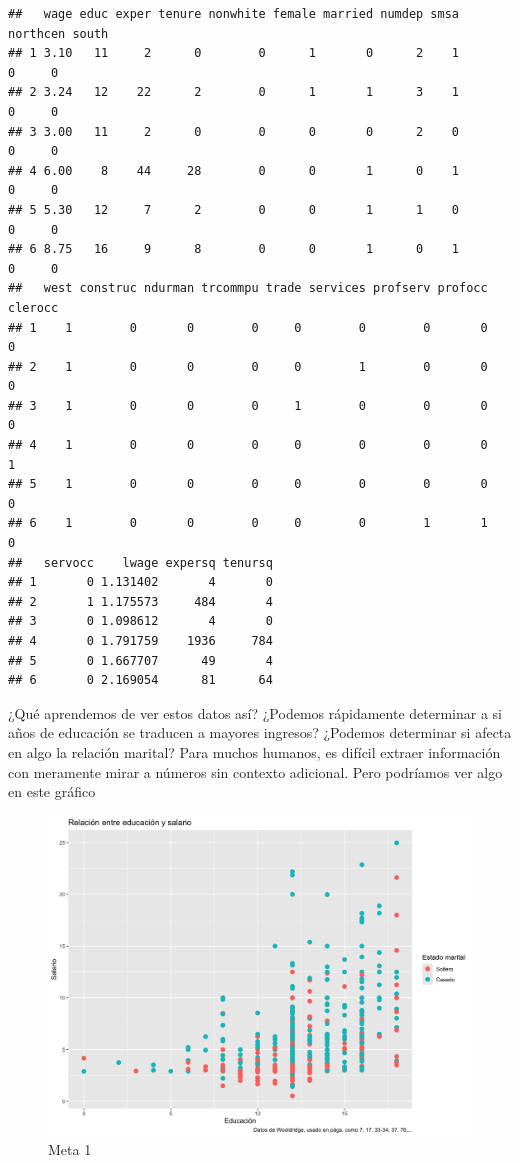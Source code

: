 \documentclass[
]{article}
\begin{document}
\begin{verbatim}
##   wage educ exper tenure nonwhite female married numdep smsa northcen south
## 1 3.10   11     2      0        0      1       0      2    1        0     0
## 2 3.24   12    22      2        0      1       1      3    1        0     0
## 3 3.00   11     2      0        0      0       0      2    0        0     0
## 4 6.00    8    44     28        0      0       1      0    1        0     0
## 5 5.30   12     7      2        0      0       1      1    0        0     0
## 6 8.75   16     9      8        0      0       1      0    1        0     0
##   west construc ndurman trcommpu trade services profserv profocc clerocc
## 1    1        0       0        0     0        0        0       0       0
## 2    1        0       0        0     0        1        0       0       0
## 3    1        0       0        0     1        0        0       0       0
## 4    1        0       0        0     0        0        0       0       1
## 5    1        0       0        0     0        0        0       0       0
## 6    1        0       0        0     0        0        1       1       0
##   servocc    lwage expersq tenursq
## 1       0 1.131402       4       0
## 2       1 1.175573     484       4
## 3       0 1.098612       4       0
## 4       0 1.791759    1936     784
## 5       0 1.667707      49       4
## 6       0 2.169054      81      64
\end{verbatim}

¿Qué aprendemos de ver estos datos así? ¿Podemos rápidamente determinar
a si años de educación se traducen a mayores ingresos? ¿Podemos
determinar si afecta en algo la relación marital? Para muchos humanos,
es difícil extraer información con meramente mirar a números sin
contexto adicional. Pero podríamos ver algo en este gráfico

\begin{figure}
\centering
\includegraphics{Relación.png}
\caption{Meta 1}
\end{figure}
\end{document}
